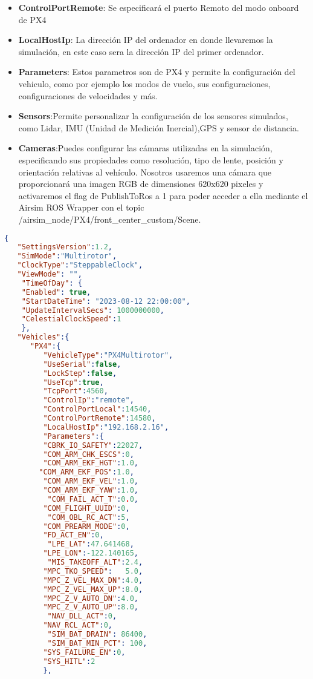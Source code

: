 \begin{enumerate}
\begin{itemize}
    \item \textbf{ControlPortRemote}: Se especificará el puerto Remoto del modo onboard de PX4
    \item \textbf{LocalHostIp}: La dirección IP del ordenador en donde llevaremos la simulación, en este caso sera la dirección IP del primer ordenador.
    \item \textbf{Parameters}: Estos parametros son de PX4 y permite la configuración del vehiculo,
    como por ejemplo los modos de vuelo, sus configuraciones, configuraciones de velocidades y más. 
    \item \textbf{Sensors}:Permite personalizar la configuración de los sensores simulados, como Lidar, IMU (Unidad de Medición Inercial),GPS y sensor de distancia. 
    \item \textbf{Cameras}:Puedes configurar las cámaras utilizadas en la simulación, especificando sus propiedades como resolución, tipo de lente, posición y orientación relativas al vehículo.
    \newline 
    Nosotros usaremos una cámara que proporcionará una imagen RGB de dimensiones 620x620 pixeles y activaremos
    el flag de PublishToRos a 1 para poder acceder a ella mediante el Airsim ROS Wrapper con el topic /airsim\_node/PX4/front\_center\_custom/Scene. 
  \end{itemize}
\end{enumerate}
\begin{code}[H]
\begin{lstlisting}[language=json]
  {
   "SettingsVersion":1.2,
   "SimMode":"Multirotor",
   "ClockType":"SteppableClock",
   "ViewMode": "",
    "TimeOfDay": {
    "Enabled": true,
    "StartDateTime": "2023-08-12 22:00:00",
    "UpdateIntervalSecs": 1000000000,
    "CelestialClockSpeed":1
    },
   "Vehicles":{
      "PX4":{
         "VehicleType":"PX4Multirotor",
         "UseSerial":false,
         "LockStep":false,
         "UseTcp":true,
         "TcpPort":4560,
         "ControlIp":"remote",
         "ControlPortLocal":14540,
         "ControlPortRemote":14580,
         "LocalHostIp":"192.168.2.16",
         "Parameters":{
         "CBRK_IO_SAFETY":22027,
         "COM_ARM_CHK_ESCS":0,
         "COM_ARM_EKF_HGT":1.0,	
      	"COM_ARM_EKF_POS":1.0,	
         "COM_ARM_EKF_VEL":1.0,	
         "COM_ARM_EKF_YAW":1.0,	
	      "COM_FAIL_ACT_T":0.0,
         "COM_FLIGHT_UUID":0,
	      "COM_OBL_RC_ACT":5,
         "COM_PREARM_MODE":0,
         "FD_ACT_EN":0,
	      "LPE_LAT":47.641468,
         "LPE_LON":-122.140165,
	      "MIS_TAKEOFF_ALT":2.4,
         "MPC_TKO_SPEED":	5.0,
         "MPC_Z_VEL_MAX_DN":4.0,
         "MPC_Z_VEL_MAX_UP":8.0,
         "MPC_Z_V_AUTO_DN":4.0,
         "MPC_Z_V_AUTO_UP":8.0,
	      "NAV_DLL_ACT":0,
         "NAV_RCL_ACT":0,
	      "SIM_BAT_DRAIN": 86400,
	      "SIM_BAT_MIN_PCT": 100,
         "SYS_FAILURE_EN":0,
         "SYS_HITL":2
         },
        
\end{lstlisting}
\end{code}

